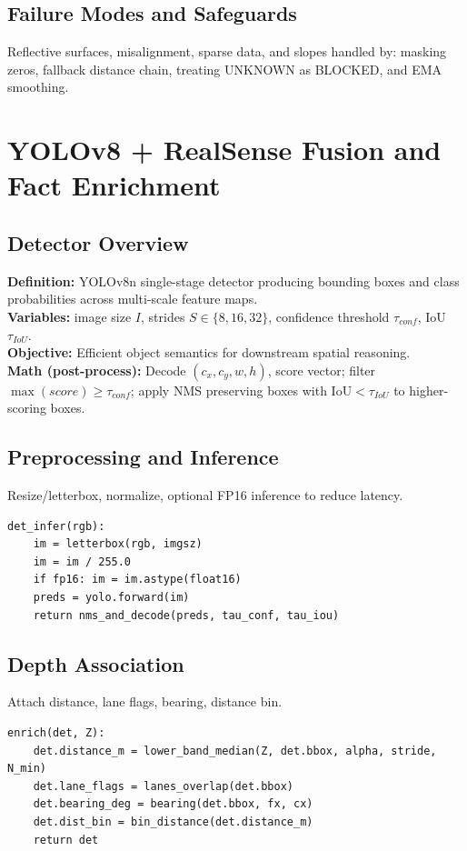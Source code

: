 \documentclass[11pt,a4paper]{article}
\begin{document}
\subsection{Failure Modes and Safeguards}
Reflective surfaces, misalignment, sparse data, and slopes handled by: masking zeros, fallback distance chain, treating UNKNOWN as BLOCKED, and EMA smoothing.

\section{YOLOv8 + RealSense Fusion and Fact Enrichment}
\subsection{Detector Overview}
\textbf{Definition:} YOLOv8n single-stage detector producing bounding boxes and class probabilities across multi-scale feature maps.\\
\textbf{Variables:} image size $I$, strides $S\in\{8,16,32\}$, confidence threshold $\tau_{conf}$, IoU $\tau_{IoU}$.\\
\textbf{Objective:} Efficient object semantics for downstream spatial reasoning.\\
\textbf{Math (post-process):} Decode $(c_x,c_y,w,h)$, score vector; filter $\max(score)\ge \tau_{conf}$; apply NMS preserving boxes with IoU$<\tau_{IoU}$ to higher-scoring boxes.

\subsection{Preprocessing and Inference}
Resize/letterbox, normalize, optional FP16 inference to reduce latency.
\begin{lstlisting}[style=code]
det_infer(rgb):
    im = letterbox(rgb, imgsz)
    im = im / 255.0
    if fp16: im = im.astype(float16)
    preds = yolo.forward(im)
    return nms_and_decode(preds, tau_conf, tau_iou)
\end{lstlisting}

\subsection{Depth Association}
Attach distance, lane flags, bearing, distance bin.
\begin{lstlisting}[style=code]
enrich(det, Z):
    det.distance_m = lower_band_median(Z, det.bbox, alpha, stride, N_min)
    det.lane_flags = lanes_overlap(det.bbox)
    det.bearing_deg = bearing(det.bbox, fx, cx)
    det.dist_bin = bin_distance(det.distance_m)
    return det
\end{lstlisting}
\end{document}
